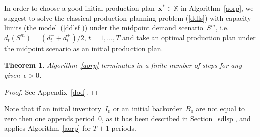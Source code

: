 \documentclass[11pt]{article}
\newtheorem{thm}{Theorem}
\newcommand{\Xset}{\mathbb{X}}
\begin{document}
In order to choose a good initial production plan~$\pmb{x}^{*}\in \Xset$ in Algorithm~\ref{aorp},
we suggest to solve the classical production planning problem (\ref{ddls}) with capacity limits 
(the model~(\ref{ddlsf})) under the midpoint demand scenario~$S^{m}$,
i.e. $d_t(S^{m})=(d^{-}_t+d^{+}_t)/2$, $t=1,\ldots,T$ and take an optimal production plan under the
midpoint scenario as an  initial production plan.
\begin{thm}
Algorithm~\ref{aorp} terminates in a finite number of steps for any given~$\epsilon>0$.
\label{tconv}
\end{thm}
\begin{proof}
See Appendix~\ref{dod}.
\end{proof}
Note that 
if an initial inventory~$I_0$ or an initial backorder~$B_0$
are not equal to zero then one appends period~$0$, as it has been described in Section~\ref{sdlsp},
and  applies Algorithm~\ref{aorp} for $T+1$ periods.
\end{document}
